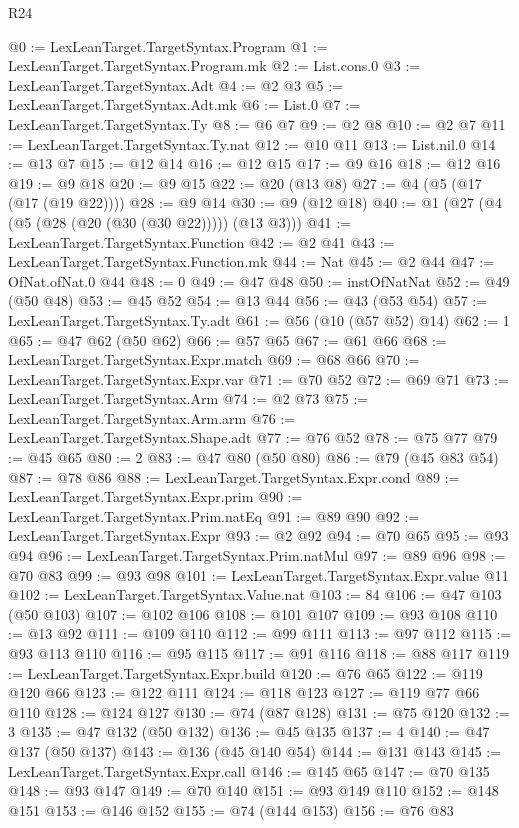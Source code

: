 \begin{lexlean}{R24}
\begin{coremodule}
@0 := LexLeanTarget.TargetSyntax.Program
@1 := LexLeanTarget.TargetSyntax.Program.mk
@2 := List.cons.{0}
@3 := LexLeanTarget.TargetSyntax.Adt
@4 := @2 @3
@5 := LexLeanTarget.TargetSyntax.Adt.mk
@6 := List.{0}
@7 := LexLeanTarget.TargetSyntax.Ty
@8 := @6 @7
@9 := @2 @8
@10 := @2 @7
@11 := LexLeanTarget.TargetSyntax.Ty.nat
@12 := @10 @11
@13 := List.nil.{0}
@14 := @13 @7
@15 := @12 @14
@16 := @12 @15
@17 := @9 @16
@18 := @12 @16
@19 := @9 @18
@20 := @9 @15
@22 := @20 (@13 @8)
@27 := @4 (@5 (@17 (@17 (@19 @22))))
@28 := @9 @14
@30 := @9 (@12 @18)
@40 := @1 (@27 (@4 (@5 (@28 (@20 (@30 (@30 @22))))) (@13 @3)))
@41 := LexLeanTarget.TargetSyntax.Function
@42 := @2 @41
@43 := LexLeanTarget.TargetSyntax.Function.mk
@44 := Nat
@45 := @2 @44
@47 := OfNat.ofNat.{0} @44
@48 := 0
@49 := @47 @48
@50 := instOfNatNat
@52 := @49 (@50 @48)
@53 := @45 @52
@54 := @13 @44
@56 := @43 (@53 @54)
@57 := LexLeanTarget.TargetSyntax.Ty.adt
@61 := @56 (@10 (@57 @52) @14)
@62 := 1
@65 := @47 @62 (@50 @62)
@66 := @57 @65
@67 := @61 @66
@68 := LexLeanTarget.TargetSyntax.Expr.match
@69 := @68 @66
@70 := LexLeanTarget.TargetSyntax.Expr.var
@71 := @70 @52
@72 := @69 @71
@73 := LexLeanTarget.TargetSyntax.Arm
@74 := @2 @73
@75 := LexLeanTarget.TargetSyntax.Arm.arm
@76 := LexLeanTarget.TargetSyntax.Shape.adt
@77 := @76 @52
@78 := @75 @77
@79 := @45 @65
@80 := 2
@83 := @47 @80 (@50 @80)
@86 := @79 (@45 @83 @54)
@87 := @78 @86
@88 := LexLeanTarget.TargetSyntax.Expr.cond
@89 := LexLeanTarget.TargetSyntax.Expr.prim
@90 := LexLeanTarget.TargetSyntax.Prim.natEq
@91 := @89 @90
@92 := LexLeanTarget.TargetSyntax.Expr
@93 := @2 @92
@94 := @70 @65
@95 := @93 @94
@96 := LexLeanTarget.TargetSyntax.Prim.natMul
@97 := @89 @96
@98 := @70 @83
@99 := @93 @98
@101 := LexLeanTarget.TargetSyntax.Expr.value @11
@102 := LexLeanTarget.TargetSyntax.Value.nat
@103 := 84
@106 := @47 @103 (@50 @103)
@107 := @102 @106
@108 := @101 @107
@109 := @93 @108
@110 := @13 @92
@111 := @109 @110
@112 := @99 @111
@113 := @97 @112
@115 := @93 @113 @110
@116 := @95 @115
@117 := @91 @116
@118 := @88 @117
@119 := LexLeanTarget.TargetSyntax.Expr.build
@120 := @76 @65
@122 := @119 @120 @66
@123 := @122 @111
@124 := @118 @123
@127 := @119 @77 @66 @110
@128 := @124 @127
@130 := @74 (@87 @128)
@131 := @75 @120
@132 := 3
@135 := @47 @132 (@50 @132)
@136 := @45 @135
@137 := 4
@140 := @47 @137 (@50 @137)
@143 := @136 (@45 @140 @54)
@144 := @131 @143
@145 := LexLeanTarget.TargetSyntax.Expr.call
@146 := @145 @65
@147 := @70 @135
@148 := @93 @147
@149 := @70 @140
@151 := @93 @149 @110
@152 := @148 @151
@153 := @146 @152
@155 := @74 (@144 @153)
@156 := @76 @83

\end{coremodule}
\end{lexlean}
